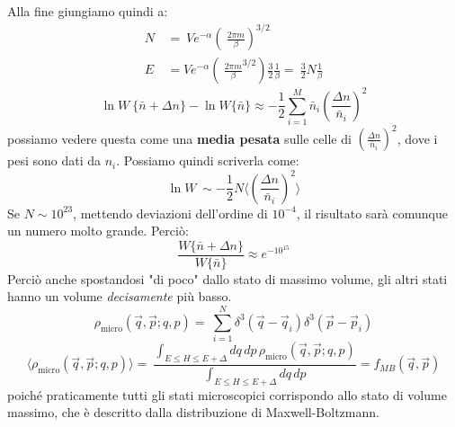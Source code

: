 \documentclass[12pt]{article}
\newcommand{\sumn}[1]{\sum_{i=1}^{#1}}
\begin{document}
Alla fine giungiamo quindi a:
\begin{align*}
N &=\ Ve^{-\alpha}\left (\ \frac{2\pi m}{\beta} \right)^{3/2}\\
E\ &= V e^{-\alpha}\left (\ \frac{2\pi m}{\beta}^{3/2}\right ) \frac{3}{2} \frac{1}{\beta} =\ \frac{3}{2}N \frac{1}{\beta}
\end{align*}
\[
\ln W\ \{\bar{n}+\Delta n\} - \ln W\{\bar{n}\} \approx -\frac{1}{2} \sumn{M} \bar{n}_i \left ( \frac{\Delta n}{\bar{n}_i}\right)^2
\]
possiamo vedere questa come una \textbf{media pesata} sulle celle di $\left ( \frac{\Delta n}{\bar{n}_i}\right)^2$, dove i pesi sono dati da $n_i$. Possiamo quindi scriverla come:
\[
\ln W\ \sim -\frac{1}{2}N \langle \left ( \frac{\Delta n}{\bar{n}_i}\right)^2 \rangle 
\]
Se $N\sim 10^{23}$, mettendo deviazioni dell'ordine di $10^{-4}$, il risultato sarà comunque un numero molto grande. Perciò:
\[
\frac{W\{\bar{n}+\Delta n\}}{W \{\bar{n}\}} \approx e^{-10^{15}}
\]
Perciò anche spostandosi "di poco" dallo stato di massimo volume, gli altri stati hanno un volume \textit{decisamente} più basso.\\
\[
\rho_{\text{micro}}(\vec{q}, \vec{p}; q,p) =\ \sum_{i=1}^N \delta^3 (\vec{q}-\vec{q}_i) \delta^3(\vec{p}-\vec{p}_i)
\]
\[
\langle \rho_{\text{micro}}(\vec{q}, \vec{p}; q,p) \rangle =\ \frac{\int_{E\leq H \leq E+\Delta} dq\,dp\, \rho_{\text{micro}}(\vec{q},\vec{p}; q,p)}{\int_{E\leq H \leq E+\Delta} dq\,dp} = f_{MB}(\vec{q},\vec{p})
\]
poiché praticamente tutti gli stati microscopici corrispondo allo stato di volume massimo, che è descritto dalla distribuzione di Maxwell-Boltzmann.\\
\end{document}
